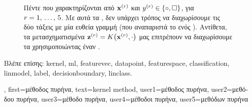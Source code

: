 {{\begin{figure}[H]
\begin{center}
		\end{center}
		{
		\caption{\foreignlanguage{greek}{Πέντε}  \foreignlanguage{greek}{που χαρακτηρίζονται από} 
		 ${\bf x}^{(r)}$ \foreignlanguage{greek}{και} 
		 $y^{(r)} \in \{ \circ, \square \}$, \foreignlanguage{greek}{για $r=1, \,\ldots, \,5$. 
		Με αυτά τα} , \foreignlanguage{greek}{δεν υπάρχει τρόπος να διαχωρίσουμε τις δύο τάξεις  
		με μία ευθεία γραμμή (που αναπαριστά το}  \foreignlanguage{greek}{ενός} ). 
		\foreignlanguage{greek}{Αντίθετα, τα μετασχηματισμένα}  ${\bf z}^{(r)} = K\big({\bf x}^{(r)},\cdot\big)$ 
		\foreignlanguage{greek}{μας επιτρέπουν να διαχωρίσουμε τα}  \foreignlanguage{greek}{χρησιμοποιώντας 
		έναν} .  \label{fig_linsep_kernel_dict}} }
		\end{figure}
		\foreignlanguage{greek}{Βλέπε επίσης:} \gls{kernel}, \gls{ml}, \gls{featurevec}, \gls{datapoint}, \gls{featurespace}, \gls{classification}, \gls{linmodel}, 
		\gls{label}, \gls{decisionboundary}, \gls{linclass}.},
	first={\foreignlanguage{greek}{μέθοδος πυρήνα}},
	text={kernel method},
	user1={\foreignlanguage{greek}{μέθοδος πυρήνα}}, %
	user2={\foreignlanguage{greek}{μεθόδου πυρήνα}}, %
	user3={\foreignlanguage{greek}{μέθοδο πυρήνα}}, %
	user4={\foreignlanguage{greek}{μέθοδοι πυρήνα}}, %
	user5={\foreignlanguage{greek}{μεθόδων πυρήνα}} %
}

